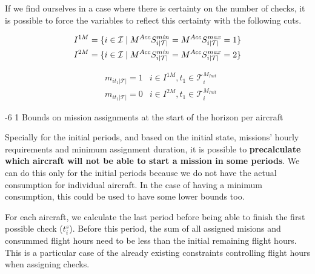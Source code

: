 \documentclass[a4paper,onecolumn,fleqn]{article}
\makeatletter
\renewcommand\section{\@startsection{section}{1}{\z@}%
                       {-6\p@ \@plus -0\p@ \@minus -0\p@}%
                       {2\p@ \@plus 0\p@ \@minus 0\p@}%
                       {\normalsize\textbf}}
\renewcommand\section{\@startsection{section}{2}{\z@}%
                       {-6\p@ \@plus -0\p@ \@minus -0\p@}%
                       {2\p@ \@plus 0\p@ \@minus 0\p@}%
                       {\normalsize\textbf}}
\renewcommand\section{\@startsection{section}{3}{\z@}%
                       {-6\p@ \@plus -0\p@ \@minus -0\p@}%
                       {1\p@ \@plus 0\p@ \@minus 0\p@}%
                       {\normalsize\itshape\bfseries}}
\makeatother
\begin{document}
   If we find ourselves in a case where there is certainty on the number of checks, it is possible to force the variables to reflect this certainty with the following cuts.

  \begin{align}
    & I^{1M} = \{i \in \mathcal{I} \mid M^{Acc}S^{min}_{i|\mathcal{T}|} = M^{Acc}S^{max}_{i|\mathcal{T}|} = 1\} \notag \\
    & I^{2M} = \{i \in \mathcal{I} \mid M^{Acc}S^{min}_{i|\mathcal{T}|} = M^{Acc}S^{max}_{i|\mathcal{T}|} = 2\} \notag
  \end{align}

  \begin{align}
    & m_{it_1|\mathcal{T}|} =  1
      & i \in I^{1M}, t_1 \in \mathcal{T}^{M_{Init}}_i \\
    & m_{it_1|\mathcal{T}|} =  0
      & i \in I^{2M}, t_1 \in \mathcal{T}^{M_{Init}}_i
  \end{align}


\section{Bounds on mission assignments at the start of the horizon per aircraft} \label{mission-assignment-for-initial-periods}

  Specially for the initial periods, and based on the initial state, missions' hourly requirements and minimum assignment duration, it is possible to \textbf{precalculate which aircraft will not be able to start a mission in some periods}. We can do this only for the initial periods because we do not have the actual consumption for individual aircraft.  In the case of having a minimum consumption, this could be used to have some lower bounds too. 

  For each aircraft, we calculate the last period before being able to finish the first possible check ($t^{s}_i$). Before this period, the sum of all assigned misions and consummed flight hours need to be less than the initial remaining flight hours. This is a particular case of the already existing constraints controlling flight hours when assigning checks.
\end{document}
